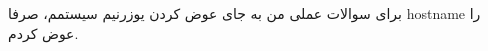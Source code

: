 \documentclass[]{article}
\begin{document}
\printheader

\noindent
برای سوالات عملی من به جای عوض کردن یوزرنیم سیستمم، صرفا hostname را عوض کردم.





\end{document}
